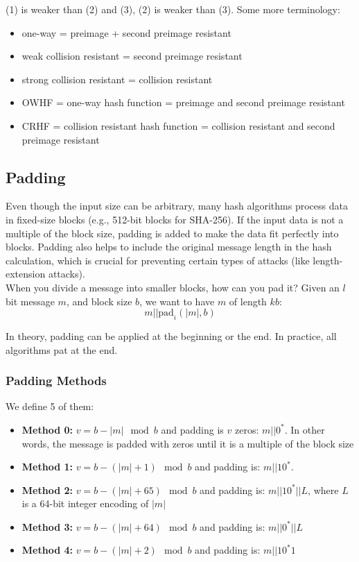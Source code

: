 (1) is weaker than (2) and (3), (2) is weaker than (3). Some more terminology:

\begin{itemize}
    \item one-way = preimage + second preimage resistant
    \item weak collision resistant = second preimage resistant
    \item strong collision resistant = collision resistant
    \item OWHF = one-way hash function = preimage and second preimage resistant
    \item CRHF = collision resistant hash function = collision resistant and second preimage resistant
\end{itemize}

\subsection{Padding}
Even though the input size can be arbitrary, many hash algorithms process data in fixed-size blocks (e.g., 512-bit blocks for SHA-256). If the input data is not a multiple of the block size, padding is added to make the data fit perfectly into blocks.
Padding also helps to include the original message length in the hash calculation, which is crucial for preventing certain types of attacks (like length-extension attacks). \\

When you divide a message into smaller blocks, how can you pad it? Given an $l$ bit message $m$, and block size $b$, we want to have $m$ of length $kb$:
\[ m || \text{pad}_i(|m|, b) \]

In theory, padding can be applied at the beginning or the end. In practice, all algorithms pat at the end. \\

\subsubsection{Padding Methods}
We define 5 of them:

\begin{itemize}
    \item \textbf{Method 0:} $v = b - |m| \mod b$ and padding is $v$ zeros: $m||0^*$. In other words, the message is padded with zeros until it is a multiple of the block size
    \item \textbf{Method 1:} $v = b - (|m|+1) \mod b$ and padding is: $m||10^*$.
    \item \textbf{Method 2:} $v = b - (|m|+65) \mod b$ and padding is: $m||10^*||L$, where $L$ is a 64-bit integer encoding of $|m|$
    \item \textbf{Method 3:} $v = b - (|m|+64) \mod b$ and padding is: $m||0^*||L$
    \item \textbf{Method 4:} $v = b - (|m|+2) \mod b$ and padding is: $m||10^*1$
\end{itemize}

